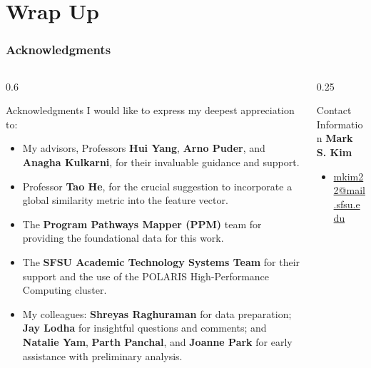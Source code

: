 \documentclass[aspectratio=169,10pt]{beamer}
\begin{document}
\section{Wrap Up}

\begin{frame}
    \frametitle{Acknowledgments}
    \fontsize{9}{9}\selectfont
    
    \begin{columns}[T]
        \begin{column}{0.6\textwidth}
            \begin{block}{Acknowledgments}
                I would like to express my deepest appreciation to:
                \begin{itemize}
                    \item My advisors, Professors \textbf{Hui Yang}, \textbf{Arno Puder}, and \textbf{Anagha Kulkarni}, for their invaluable guidance and support.
                    \item Professor \textbf{Tao He}, for the crucial suggestion to incorporate a global similarity metric into the feature vector.
                    \item The \textbf{Program Pathways Mapper (PPM)} team for providing the foundational data for this work.
                    \item The \textbf{SFSU Academic Technology Systems Team} for their support and the use of the POLARIS High-Performance Computing cluster.
                    \item My colleagues: \textbf{Shreyas Raghuraman} for data preparation; \textbf{Jay Lodha} for insightful questions and comments; and \textbf{Natalie Yam}, \textbf{Parth Panchal}, and \textbf{Joanne Park} for early assistance with preliminary analysis.
                \end{itemize}
            \end{block}
        \end{column}

        \begin{column}{0.25\textwidth}
            \begin{block}{Contact Information}
                \textbf{Mark S. Kim}
                \begin{itemize}
                    \item \href{mailto:mkim22@mail.sfsu.edu}{mkim22@mail.sfsu.edu}
                \end{itemize}
            \end{block}
        \end{column}
    \end{columns}
\end{frame}
\end{document}
